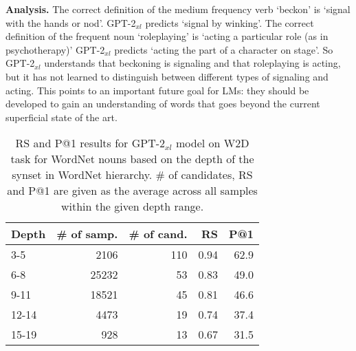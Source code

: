 \documentclass[11pt,a4paper]{article}
\begin{document}
\textbf{Analysis.}
The correct definition of the medium frequency verb `beckon' is  `signal with the hands or nod'. GPT-2$_{xl}$ predicts  `signal by winking'.
The correct definition of the frequent noun `roleplaying' is `acting a particular role (as in psychotherapy)' GPT-2$_{xl}$ predicts `acting the part of a character on stage'.
So GPT-2$_{xl}$ understands that beckoning is signaling and that roleplaying is acting, but it has not learned to distinguish between different types of signaling and acting.
This points to an important future goal for LMs: they should be developed to gain an understanding of words that goes beyond the current superficial state of the art.


\begin{table}
    \centering
    \begin{tabular}{l|rrrr}
        \hline
         \textbf{Depth} & \textbf{\# of samp.} & \textbf{\# of cand.} & \textbf{RS} & \textbf{P@1} \\ \hline
     3-5 & 2106 & 110 & 0.94 & 62.9 \\
     6-8 & 25232 & 53 & 0.83 & 49.0 \\
     9-11 & 18521 & 45 & 0.81 & 46.6 \\
     12-14 & 4473 & 19 & 0.74 & 37.4 \\ 
     15-19 & 928 & 13 & 0.67 & 31.5 \\ \hline
     
    \end{tabular}
    \caption{RS and P@1 results for GPT-2$_{xl}$ model on W2D task for WordNet nouns based on the depth of the synset in WordNet hierarchy. \# of candidates, RS and P@1 are given as the average across all samples within the given depth range. }
    \label{tab:WN_depth}
\end{table}
\end{document}
